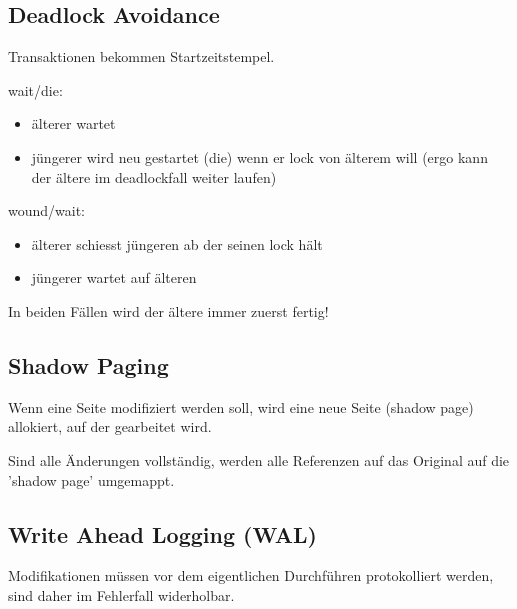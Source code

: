 \documentclass[10pt,a4paper,oneside]{report}
\begin{document}
\subsection*{Deadlock Avoidance}

Transaktionen bekommen Startzeitstempel.

wait/die:

\begin{itemize}
\item älterer wartet
\item jüngerer wird neu gestartet (die) wenn er lock von älterem will (ergo kann der ältere im deadlockfall weiter laufen)
\end{itemize}

wound/wait:

\begin{itemize}
\item älterer schiesst jüngeren ab der seinen lock hält
\item jüngerer wartet auf älteren
\end{itemize}

In beiden Fällen wird der ältere immer zuerst fertig!

\subsection*{Shadow Paging}

Wenn eine Seite modifiziert werden soll, wird eine neue Seite (shadow page) allokiert, auf der gearbeitet wird.

Sind alle Änderungen vollständig, werden alle Referenzen auf das Original auf die 'shadow page' umgemappt.

\subsection*{Write Ahead Logging (WAL)}

Modifikationen müssen vor dem eigentlichen Durchführen protokolliert werden, sind daher im Fehlerfall widerholbar.
\end{document}
